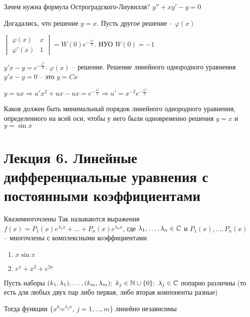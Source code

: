 \documentclass[12pt]{article}
\begin{document}
\begin{Remark}{Зачем нужна формула Остроградского-Лиувилля?}
    $y'' + xy' - y = 0$

    Догадались, что решение $y = x$. Пусть другое решение -- $\varphi(x)$

    $\begin{vmatrix}
        \varphi(x) & x \\
        \varphi'(x) & 1
    \end{vmatrix} = W(0) e^{-\frac{x^2}{2}}$. НУО $W(0) = -1$

    $y'x - y = e^{-\frac{x^2}{2}}$. $\varphi(x)$ -- решение. Решение линейного однородного уравнения $y'x - y = 0$ -- это $y = Cx$

    $y = ux \Rightarrow u'x^2 + ux - ux = e^{-\frac{x^2}{2}} \Rightarrow u' = x^{-2} e^{-\frac{x^2}{2}}$
\end{Remark}

\begin{Exercise}{}
    Каков должен быть минимальный порядок линейного однородного уравнения, определенного на всей оси, чтобы у него были одновременно решения $y = x$ и $y = \sin x$
\end{Exercise}

\newpage 

\section{Лекция 6. Линейные дифференциальные уравнения с постоянными коэффициентами}

\begin{defin}{Квазимногочлены}
    Так называются выражения $f(x) = P_1(x)e^{\lambda_1x} + \ldots + P_n(x)e^{\lambda_nx}$, где $\lambda_1, \ldots, \lambda_n \in \mathbb C$ и $P_1(x), \ldots, P_n(x)$ -- многочлены с комплексными коэффициентами
\end{defin}

\begin{Example}{}
    \begin{enumerate}
        \item $x\sin x$
        \item $e^x + x^2 + e^{2x}$
    \end{enumerate}
\end{Example}

\begin{lem}{}
    Пусть наборы $(k_1, \lambda_1), \ldots, (k_m, \lambda_m);\ k_j \in \mathbb N \cup \{0\};\ \lambda_j \in \mathbb C$ попарно различны (то есть для любых двух пар либо первая, либо вторая компоненты разные)
    
    Тогда функции $\{x^{k_j}e^{\lambda_jx},\ j = 1, \ldots, m\}$ линейно независимы
\end{lem}
\end{document}
